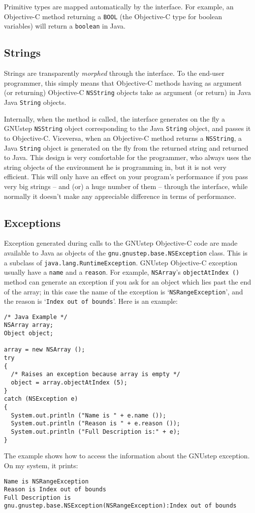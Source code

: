 Primitive types are mapped automatically by the interface.  For
example, an Objective-C method returning a \texttt{BOOL} (the
Objective-C type for boolean variables) will return a \texttt{boolean}
in Java.

\subsection{Strings}

Strings are transparently \emph{morphed} through the interface.  To
the end-user programmer, this simply means that Objective-C methods
having as argument (or returning) Objective-C \texttt{NSString}
objects take as argument (or return) in Java Java \texttt{String}
objects.

Internally, when the method is called, the interface generates on the
fly a GNUstep \texttt{NSString} object corresponding to the Java
\texttt{String} object, and passes it to Objective-C.  Viceversa, when
an Objective-C method returns a \texttt{NSString}, a Java
\texttt{String} object is generated on the fly from the returned string and
returned to Java.  This design is very comfortable for the programmer,
who always uses the string objects of the environment he is
programming in, but it is not very efficient.  This will only have an
effect on your program's performance if you pass very big strings --
and (or) a huge number of them -- through the interface, while normally 
it doesn't make any appreciable difference in terms of performance.

\subsection{Exceptions}

Exception generated during calls to the GNUstep Objective-C code are
made available to Java as objects of the
\texttt{gnu.gnustep.base.NSException} class.  This is a subclass of
\texttt{java.lang.RuntimeException}.  GNUstep Objective-C exception
usually have a \texttt{name} and a \texttt{reason}.  For example,
\texttt{NSArray}'s \texttt{objectAtIndex ()} method can generate an
exception if you ask for an object which lies past the end of the
array; in this case the name of the exception is
`\texttt{NSRangeException}', and the reason is `\texttt{Index out of
bounds}'.  Here is an example:
\begin{verbatim}
/* Java Example */
NSArray array;
Object object;

array = new NSArray ();
try 
{
  /* Raises an exception because array is empty */
  object = array.objectAtIndex (5);
}
catch (NSException e)
{
  System.out.println ("Name is " + e.name ());
  System.out.println ("Reason is " + e.reason ());
  System.out.println ("Full Description is:" + e);
}
\end{verbatim}
The example shows how to access the information about the GNUstep 
exception.  On my system, it prints:
\begin{verbatim}
Name is NSRangeException
Reason is Index out of bounds
Full Description is gnu.gnustep.base.NSException(NSRangeException):Index out of bounds
\end{verbatim}

